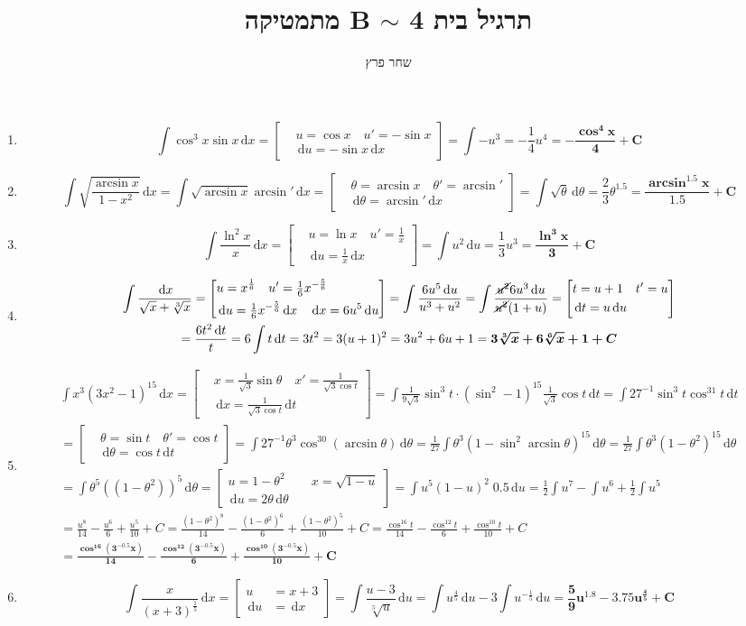 \documentclass[]{article}
\author{שחר פרץ}
\title{מתמטיקה B $\sim$ תרגיל בית 4}
\newcommand\lnx   {\ln x}
\newcommand\cosx  {\cos x}
\newcommand\sinx  {\sin x}
\newcommand\sint  {\sin \theta}
\newcommand\dx    {\,\mathrm{d}x}
\newcommand\dt    {\,\mathrm{d}t}
\newcommand\dtt   {\,\mathrm{d}\theta}
\newcommand\du    {\,\mathrm{d}u}
\newcommand\pu[3]{\csb{\begin{aligned}
			&u = #1 \quad u' = #2 \\
			&\du = #2 #3
	\end{aligned}}}
\newcommand\pus[2]{\csb{\begin{aligned}
			u &= #1 \\
			\du &= #2
\end{aligned}}}
\newcommand\ptt[3]{\csb{\begin{aligned}
			&\theta = #1 \quad \theta' = #2 \\
			&\dtt = #2 #3
\end{aligned}}}
\newcommand\ptu[3]{\csb{\begin{aligned}
			&t = #1 \quad t' = #2 \\
			&\dt = #2 \du #3
\end{aligned}}}
\newcommand\px[3]{\csb{\begin{aligned}
&x = #1 \quad x' = #2 \\
&\dx = #2 #3
\end{aligned}}}
\newcommand\ta    {\theta}
\newcommand\op    {^{-1}}
\newcommand\cl [1]    {\left ( #1 \right )}
\newcommand\csb[1]    {\left [ #1 \right ]}
\begin{document}
	\maketitle
	
	\section{}
	\begin{enumerate}
		\item 
			\[ \int \cos^3x \sinx \dx = \pu{\cosx}{-\sinx}{\dx} = \int -u^3 = -\frac{1}{4}u^4 = \bm{-\frac{\cos^4x}{4} + C} \]
		\item 
			\[ \int \sqrt{\frac{\arcsin x}{1 - x^2}} \dx = \int \sqrt{\arcsin x} \arcsin' \dx = \ptt{\arcsin x}{\arcsin'}{\dx} = \int \sqrt\theta \dtt = \frac{2}{3}\theta^{1.5} = \bm{\frac{\arcsin^{1.5} x}{1.5} + C} \]
		\item 
			\[ \int \frac{\ln^2x}{x} \dx = \pu{\lnx}{\tfrac{1}{x}}{\dx} = \int u^2 \du = \frac{1}{3}u^3 = \bm{\frac{\ln^3x}{3} + C} \]
		\item 
			\begin{multline*}
				\int \frac{\dx}{\sqrt x + \sqrt[3]{x}} = \pu{x^{\frac{1}{6}}}{\tfrac{1}{6}x^{-\frac{5}{6}}}{\dx \quad \dx = 6u^5\du } = \int \frac{6u^5\du}{u^3 + u^2} = \int \frac{\cancel{u^2}6u^3\du}{\cancel{u^2}(1 + u)} = \ptu{u + 1}{u}{} \\
				 = \frac{6t^2\dt}{t} = 6 \int t \dt = 3t^2 = 3(u + 1)^2 = 3u^2 + 6u + 1 = \bm{3\sqrt[3]{x} + 6\sqrt[6]{x} + 1 + C}
			\end{multline*}
		\item 
			\begin{multline*}
				\int x^3(3x^2 - 1)^{15}\dx = \px{\tfrac{1}{\sqrt3}\sint}{\tfrac{1}{\sqrt3\cos t}}{\dt} = \int \frac{1}{9\sqrt3}\sin^3 t \cdot (\sin^2 - 1)^{15} \frac{1}{\sqrt3}\cos t\dt = \int 27\op \sin^3 t \cos^{31}t \dt \\
				= \ptt{\sin t}{\cos t}{\dt} = \int 27\op \ta^3 \cos^{30}(\arcsin \ta)\dtt = \frac{1}{27} \int \ta^3(1 - \sin^2\arcsin\ta)^{15}\dtt = \frac{1}{27} \int \ta^3(1 - \ta^2)^{15}\dtt \\
				= \int \ta^5((1 - \ta^2))^5\dtt = \csb{\begin{aligned}
						u = 1 - \ta^2 & \quad x = \sqrt{1 - u} \\
						\du = 2\ta\dtt
				\end{aligned}} = \int u^5(1 - u)^2 \; 0.5\du  = \frac{1}{2}\int u^7 - \int u^6 + \frac{1}{2} \int u^5 \\
				= \frac{u^8}{14} - \frac{u^6}{6} + \frac{u^5}{10} + C = \frac{(1 - \ta^2)^8}{14} - \frac{(1 - \ta^2)^6}{6} + \frac{(1 - \ta^2)^5}{10} + C = \frac{\cos^{16}t}{14} - \frac{\cos^{12}t}{6} + \frac{\cos^{10}t}{10} +C \\
				= \bm{\frac{\cos^{16}\cl{3^{-0.5}x}}{14} - \frac{\cos^{12}\cl{3^{-0.5}x}}{6} + \frac{\cos^{10}\cl{3^{-0.5}x}}{10} + C}
			\end{multline*}
		\item 
			\[ \int \frac{x}{(x + 3)^{\frac{1}{5}}}\dx = \pus{x + 3}{\dx} = \int \frac{u - 3}{\sqrt[5]{u}}\du = \int u^{\frac{4}{5}}\du - 3\int u^{-\frac{1}{5}}\du = \bm{\frac{5}{9}u^{1.8} - 3.75u^{\frac{4}{5}} + C} \]
	\end{enumerate}
\end{document}

